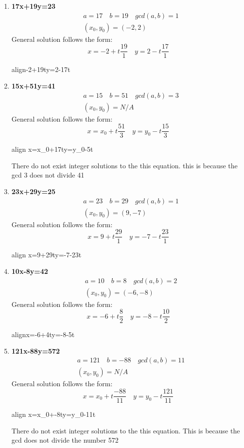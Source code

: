 \documentclass[11pt]{article}
\newcommand{\boxedeq}[2]{\begin{empheq}[box={\fboxsep=6pt\fbox}]{align}\label{#1}#2\end{empheq}}
\begin{document}
\begin{enumerate}
\begin{enumerate}
        \item \textbf{17x+19y=23}
        \begin{align*}
         &a=17 \quad b=19\quad gcd(a,b)=1\\
         &(x_0,y_0)=(-2,2)
        \end{align*}
        General solution follows the form:
        \[
           x=-2+t\frac{19}{1}\quad y=2-t\frac{17}{1}
        \]
        \boxedeq{}{-2+19t\quad y=2-17t}

        \item \textbf{15x+51y=41}
        \begin{align*}
         &a=15 \quad b=51\quad gcd(a,b)=3\\
         &(x_0,y_0)=N/A
        \end{align*}
        General solution follows the form:
       \[
       x=x_0+t\frac{51}{3}\quad y=y_0-t\frac{15}{3}
       \]
        \boxedeq{}{ x=x_0+17t\quad y=y_0-5t}
        There do not exist integer solutions to the this equation.
        this is because the gcd 3 does not divide 41
        \item \textbf{23x+29y=25}
        \begin{align*}
         &a=23 \quad b=29\quad gcd(a,b)=1\\
         &(x_0,y_0)=(9,-7)
        \end{align*}
        General solution follows the form:
        \[
           x=9+t\frac{29}{1}\quad y=-7-t\frac{23}{1}
        \]
        \boxedeq{}{ x=9+29t\quad y=-7-23t}
        \item \textbf{10x-8y=42}
        \begin{align*}
         &a=10 \quad b=8\quad gcd(a,b)=2\\
         &(x_0,y_0)=(-6,-8)
        \end{align*}
        General solution follows the form:
        \[
           x=-6+t\frac{8}{2}\quad y=-8-t\frac{10}{2}
        \]
        \boxedeq{}{x=-6+4t\quad y=-8-5t}
        \item \textbf{121x-88y=572}
        \begin{align*}
         &a=121 \quad b=-88\quad gcd(a,b)=11\\
         &(x_0,y_0)=N/A
        \end{align*}
        General solution follows the form:
       \[
       x=x_0+t\frac{-88}{11}\quad y=y_0-t\frac{121}{11}
       \]
        \boxedeq{}{ x=x_0+-8t\quad y=y_0-11t}
        There do not exist integer solutions to the this equation.  This is because the gcd does not divide the number 572
    \end{enumerate}


\end{enumerate}
\end{document}
